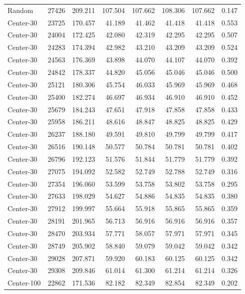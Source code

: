 \begin{longtable}{lrrrrrrr}
Random & 27426 & 209.211 & 107.504 & 107.662 & 108.306 & 107.662 & 0.147\\
Center-30 & 23725 & 170.457 & 41.189 & 41.462 & 41.418 & 41.418 & 0.553\\
Center-30 & 24004 & 172.425 & 42.080 & 42.319 & 42.295 & 42.295 & 0.507\\
Center-30 & 24283 & 174.394 & 42.982 & 43.210 & 43.209 & 43.209 & 0.524\\
Center-30 & 24563 & 176.369 & 43.898 & 44.070 & 44.107 & 44.070 & 0.392\\
Center-30 & 24842 & 178.337 & 44.820 & 45.056 & 45.046 & 45.046 & 0.500\\
Center-30 & 25121 & 180.306 & 45.754 & 46.033 & 45.969 & 45.969 & 0.468\\
Center-30 & 25400 & 182.274 & 46.697 & 46.934 & 46.910 & 46.910 & 0.452\\
Center-30 & 25679 & 184.243 & 47.651 & 47.918 & 47.858 & 47.858 & 0.433\\
Center-30 & 25958 & 186.211 & 48.616 & 48.847 & 48.825 & 48.825 & 0.429\\
Center-30 & 26237 & 188.180 & 49.591 & 49.810 & 49.799 & 49.799 & 0.417\\
Center-30 & 26516 & 190.148 & 50.577 & 50.784 & 50.781 & 50.781 & 0.402\\
Center-30 & 26796 & 192.123 & 51.576 & 51.844 & 51.779 & 51.779 & 0.392\\
Center-30 & 27075 & 194.092 & 52.582 & 52.749 & 52.788 & 52.749 & 0.316\\
Center-30 & 27354 & 196.060 & 53.599 & 53.758 & 53.802 & 53.758 & 0.295\\
Center-30 & 27633 & 198.029 & 54.627 & 54.886 & 54.835 & 54.835 & 0.380\\
Center-30 & 27912 & 199.997 & 55.664 & 55.918 & 55.865 & 55.865 & 0.359\\
Center-30 & 28191 & 201.965 & 56.713 & 56.916 & 56.916 & 56.916 & 0.357\\
Center-30 & 28470 & 203.934 & 57.771 & 58.057 & 57.971 & 57.971 & 0.345\\
Center-30 & 28749 & 205.902 & 58.840 & 59.079 & 59.042 & 59.042 & 0.342\\
Center-30 & 29028 & 207.871 & 59.920 & 60.183 & 60.125 & 60.125 & 0.342\\
Center-30 & 29308 & 209.846 & 61.014 & 61.300 & 61.214 & 61.214 & 0.326\\
Center-100 & 22862 & 171.536 & 82.182 & 82.349 & 82.854 & 82.349 & 0.202\\

\end{longtable}
